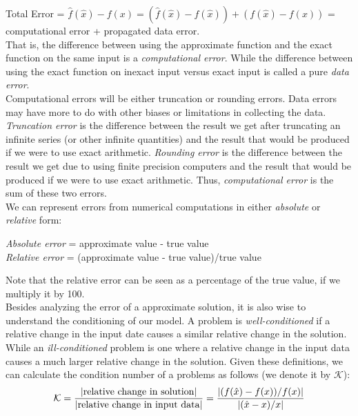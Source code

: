 \documentclass[11pt,a4paper,oneside]{report}
\begin{document}
Total Error = $\hat{f}(\hat{x}) - f(x) = (\hat{f}(\hat{x}) - f(\hat{x})) + (f(\hat{x}) - f(x))$  = computational error + propagated data error.\\

That is, the difference between using the approximate function and the exact function on the same input is a \emph{computational error}. While the difference between using the exact function on inexact input versus exact input is called a pure \emph{data error}.\\

Computational errors will be either truncation or rounding errors. Data errors may have more to do with other biases or limitations in collecting the data. \emph{Truncation error} is the difference between the result we get after truncating an infinite series (or other infinite quantities) and the result that would be produced if we were to use exact arithmetic. \emph{Rounding error} is the difference between the result we get due to using finite precision computers and the result that would be produced if we were to use exact arithmetic. Thus, \emph{computational error} is the sum of these two errors.\\

We can represent errors from numerical computations in either \emph{absolute} or \emph{relative} form:
\begin{center}
\emph{Absolute error} = approximate value - true value\\
\emph{Relative error} = (approximate value - true value)/true value
\end{center}

Note that the relative error can be seen as a percentage of the true value, if we multiply it by 100.\\

Besides analyzing the error of a approximate solution, it is also wise to understand the conditioning of our model. A problem is \emph{well-conditioned} if a relative change in the input date causes a similar relative change in the solution. While an \emph{ill-conditioned} problem is one where a relative change in the input data causes a much larger relative change in the solution. Given these definitions, we can calculate the condition number of a problems as follows (we denote it by $\mathcal{K}$):
\[\mathcal{K} = \frac{|\textnormal{relative change in solution}|}{|\textnormal{relative change in input data}|} = \frac{|(f(\hat{x})-f(x))/f(x)|}{|(\hat{x}-x)/x|}\]
\end{document}
